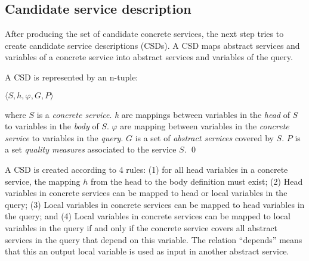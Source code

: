 
\subsection{Candidate service description}

After producing the set of candidate concrete services, the next step tries 
to create candidate service descriptions (CSDs). 
A CSD maps abstract services and variables of a concrete service into abstract 
services and variables of the query. 

\begin{definition}
A CSD is represented by an n-tuple:
\begin{center}
$\langle S, h, \varphi, G, P\rangle$
\end{center}
where $S$ is a \textit{concrete service}. 
\textit{h} are mappings between variables in the \textit{head} of $S$ to variables in the \textit{body} of $S$. 
$\varphi$ are mapping between variables in the \textit{concrete service} to variables in the \textit{query}.
$G$ is a set of \textit{abstract services} covered by $S$. 
$P$ is a set \textit{quality measures} associated to the service $S$. 
\qed
\end{definition} 
 
A CSD is created according to 4 rules: (1) for all head variables in a concrete service, the mapping $h$ from the head to the body definition must exist; (2) Head variables in concrete services can be mapped to head or local variables in the query; (3) Local variables in concrete services can be mapped to head variables in the query;
and (4) Local variables in concrete services can be mapped to local
variables in the query if and only if the concrete service covers all abstract services in the query that depend on this variable. The relation ``depends''  means that this an output local variable is used as input in another abstract service. 


